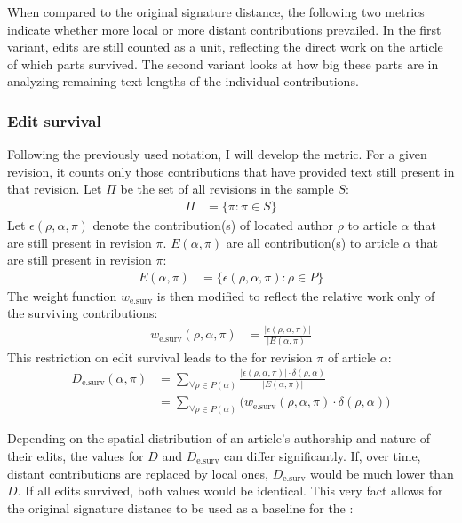 When compared to the original signature distance, the following two metrics indicate whether more local or more distant contributions prevailed.
In the first variant, edits are still counted as a unit, reflecting the direct work on the article of which parts survived.
The second variant looks at how big these parts are in analyzing remaining text lengths of the individual contributions.

\subsubsection{Edit survival}

Following the previously used notation, I will develop the  metric.
For a given revision, it counts only those contributions that have provided text still present in that revision.
Let $\Pi$ be the set of all revisions in the sample $S$:
\begin{align*}
\Pi &= \{\pi : \pi \in S\}
\end{align*}
Let $\epsilon(\rho,\alpha,\pi)$ denote the contribution(s) of located author $\rho$ to article $\alpha$ that are still present in revision $\pi$.
$E(\alpha,\pi)$ are all contribution(s) to article $\alpha$ that are still present in revision $\pi$:
\begin{align*}
E(\alpha,\pi) &= \{\epsilon(\rho,\alpha,\pi) : \rho \in P\}
\end{align*}
The weight function $w_{\text{e.surv}}$ is then modified to reflect the relative work only of the surviving contributions: 
\begin{align*}
w_{\text{e.surv}}(\rho,\alpha,\pi) &= \frac{|\epsilon(\rho,\alpha,\pi)|}{|E(\alpha,\pi)|}
\end{align*}
This restriction on edit survival leads to the  for revision $\pi$ of article $\alpha$:
\begin{equation}\label{eqn:sigdistsurvival}
\begin{split}
D_{\text{e.surv}}(\alpha,\pi) & = \sum_{\forall \rho \in P(\alpha)} \frac{|\epsilon(\rho,\alpha,\pi)| \cdot \delta(\rho,\alpha)}{|E(\alpha,\pi)|} \\
 & =  \sum_{\forall \rho \in P(\alpha)} \big(w_{\text{e.surv}}(\rho,\alpha,\pi) \cdot \delta(\rho,\alpha)\big)
 \end{split}
\end{equation}

Depending on the spatial distribution of an article's authorship and nature of their edits, the values for $D$ and $D_{\text{e.surv}}$ can differ significantly.
If, over time, distant contributions are replaced by local ones, $D_{\text{e.surv}}$ would be much lower than $D$. 
If all edits survived, both values would be identical. 
This very fact allows for the original signature distance to be used as a baseline for the :

